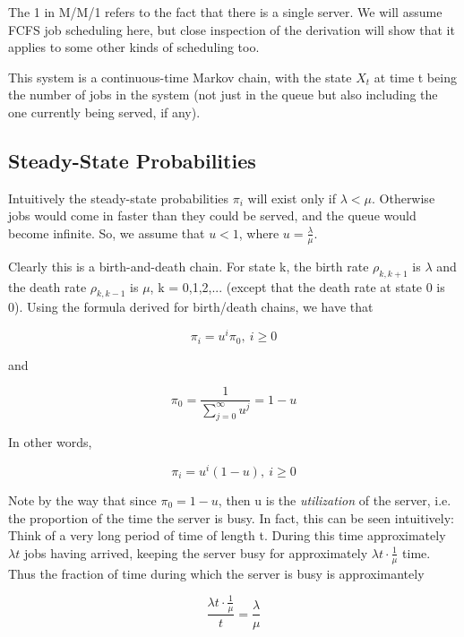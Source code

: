 The 1 in M/M/1 refers to the fact that there is a single server.  We
will assume FCFS job scheduling here, but close inspection of the
derivation will show that it applies to some other kinds of scheduling
too.

This system is a continuous-time Markov chain, with the state $X_t$ at
time t being the number of jobs in the system (not just in the queue but
also including the one currently being served, if any).  

\subsection{Steady-State Probabilities}

Intuitively the steady-state probabilities $\pi_i$ will exist only if
$\lambda < \mu$.  Otherwise jobs would come in faster than they could be
served, and the queue would become infinite.  So, we assume that $u <
1$, where $u = \frac{\lambda}{\mu}$.

Clearly this is a birth-and-death chain.  For state k, the birth rate
$\rho_{k,k+1}$ is $\lambda$ and the death rate $\rho_{k,k-1}$ is  $\mu$,
k = 0,1,2,... (except that the death rate at state 0 is 0).  Using the
formula derived for birth/death chains, we have that 
 
\begin{equation} 
\pi_i = u^i \pi_0, ~ i \geq 0 
\end{equation}

and

\begin{equation}
\pi_0 = \frac{1}{\sum_{j=0}^\infty u^j} = 1 - u
\end{equation}

In other words,

\begin{equation}
\label{mm1pi}
\pi_i = u^i (1-u), ~ i \geq 0
\end{equation}

Note by the way that since $\pi_0 = 1-u$, then u is the {\it
utilization} of the server, i.e.  the proportion of the time the server
is busy.  In fact, this can be seen intuitively:  Think of a very long
period of time of length t.  During this time approximately $\lambda t$
jobs having arrived, keeping the server busy for approximately $\lambda
t \cdot \frac{1}{\mu}$ time.  Thus the fraction of time during which the
server is busy is approximantely

\begin{equation}
\label{intuit}
\frac{\lambda t \cdot \frac{1}{\mu}} 
{t}
= \frac{\lambda}{\mu}
\end{equation}

